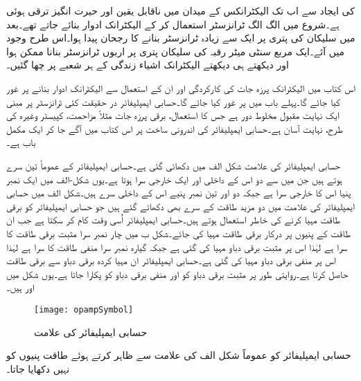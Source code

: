 
  کی ایجاد سے اب تک الیکٹرانکس کے میدان میں ناقابل یقین اور حیرت انگیز ترقی ہوئی ہے۔شروع میں الگ الگ ٹرانزسٹر استعمال کر کے الیکٹرانک ادوار بنائے جاتے تھے۔بعد میں سلیکان کی پتری  پر ایک سے زیادہ ٹرانزسٹر بنانے کا رجحان پیدا ہوا۔اس طرح   وجود میں آئے۔ایک مربع سنٹی میٹر رقبہ کی سلیکان پتری پر اربوں ٹرانزسٹر بنانا ممکن ہوا اور دیکھتے ہی دیکھتے الیکٹرانک اشیاء  زندگی کے ہر شعبے پر چھا گئیں۔

اس کتاب میں الیکٹرانک پرزہ جات کی کارکردگی اور ان کے استعمال سے الیکٹرانک ادوار بنانے پر غور کیا جائے گا۔پہلے باب میں   پر غور کیا جائے گا۔حسابی ایمپلیفائر در حقیقت کئی ٹرانزسٹر پر مبنی ایک نہایت مقبول مخلوط دور ہے جس کا استعمال، برقی پرزہ جات مثلاً مزاحمت، کپیسٹر وغیرہ  کی طرح، نہایت آسان ہے۔حسابی ایمپلیفائر کی اندرونی ساخت پر اس کتاب میں آگے جا کر ایک مکمل باب ہے۔

	
حسابی ایمپلیفائر کی علامت شکل  الف  میں دکھائی گئی ہے۔حسابی ایمپلیفائر کے عموماً تین سرے ہوتے ہیں جن میں سے دو اس کے داخلی اور ایک خارجی سرا ہوتا ہے۔یوں شکل-الف میں ایک نمبر پنیا اس کا خارجی سرا ہے جبکہ دو اور تین نمبر پنیے اس کے داخلی سرے ہیں۔شکل  الف     میں حسابی ایمپلیفائر کی علامت میں دو مزید طاقت کے سرے بھی دکھائے گئے ہیں جو حسابی ایمپلیفائر کو برقی طاقت مہیا کرنے کی خاطر استعمال ہوتے ہیں۔حسابی ایمپلیفائر اُسی وقت کام کر سکتا ہے جب ان طاقت کے پنیوں پر درکار برقی طاقت مہیا کی جائے۔شکل  ب میں چار نمبر سرا مثبت برقی طاقت کا سرا ہے لہٰذا اس  پر مثبت برقی دباو مہیا کی گئی ہے  جبکہ گیارہ نمبر سرا منفی طاقت کا سرا ہے لہٰذا اس  پر منفی برقی دباو مہیا کی گئی ہے۔حسابی ایمپلیفائر ان مہیا کردہ برقی دباو سے برقی طاقت حاصل کرتا ہے۔روایتی طور پر مثبت برقی دباو کو  اور منفی برقی دباو  کو  پکارا جاتا ہے۔یوں شکل میں اور ہیں۔
\begin{figure}
\centering
\texttt{[image: opampSymbol]}
\caption{حسابی ایمپلیفائر کی علامت}
\label{شکل_حسابی_ایمپلیفائر_کی_علامت}
\end{figure}
حسابی ایمپلیفائر کو عموماً شکل  الف کی علامت سے ظاہر کرتے ہوئے طاقت پنیوں کو نہیں دکھایا جاتا۔

